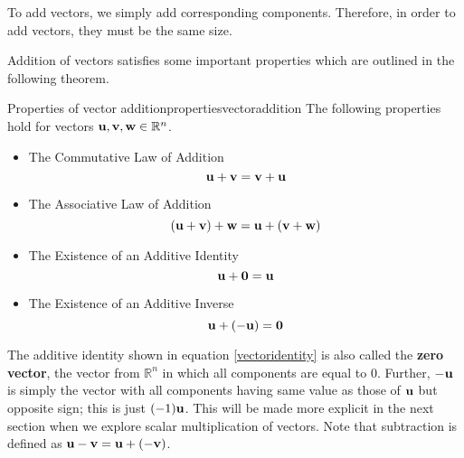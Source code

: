 To add vectors, we simply add corresponding components. Therefore, in order to add vectors, they must
be the same size.

Addition of vectors satisfies some important properties which are outlined in the following theorem.  

\begin{theorem}{Properties of vector addition}{propertiesvectoraddition}
The following properties hold for vectors ${\bf u},{\bf v}, {\bf w} \in \mathbb{R}^{n}$.
\begin{itemize}
\item The Commutative Law of Addition
\begin{equation*}
{\bf u}+{\bf v}={\bf v}+{\bf u}
\end{equation*}
\item The Associative Law of Addition
\begin{equation*}
\left( {\bf u}+{\bf v}\right) +{\bf w}={\bf u}+\left( {\bf v}+{\bf w}\right)
\end{equation*}
\item The Existence of an Additive Identity
\begin{equation}
{\bf u}+{\bf 0}={\bf u}
\label{vectoridentity} 
\end{equation}
\item The Existence of an Additive Inverse
\begin{equation*}
{\bf u}+\left( -{\bf u}\right) ={\bf 0}  
\end{equation*}
\end{itemize}
\end{theorem}

The additive identity shown in equation
\ref{vectoridentity} is also called the \textbf{zero vector}, 
the vector from $\mathbb{R}^{n}$ in which all components are equal to $0$.
Further, $-{\bf u}$ is simply the vector with all components having
same value as those of ${\bf u}$ but opposite sign; this is just
$(-1){\bf u}$. This will be made more explicit in the next
section when we explore scalar multiplication of vectors. Note that subtraction is defined as ${\bf u}-{\bf v} = {\bf u}+\left(
-{\bf v} \right)$.
